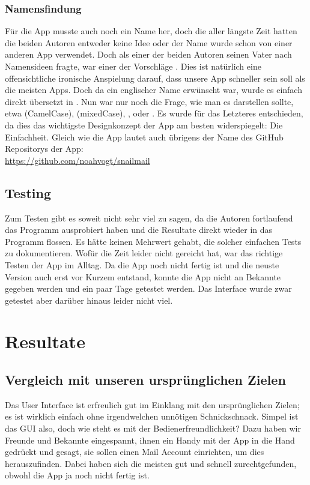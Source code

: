 \documentclass[a4paper,11pt]{article}
\begin{document}
\subsubsection{Namensfindung}
Für die App musste auch noch ein Name her, doch die aller längste Zeit hatten die beiden Autoren entweder keine Idee oder der Name wurde schon von einer anderen App verwendet. Doch als einer der beiden Autoren seinen Vater nach Namensideen fragte, war einer der Vorschläge . Dies ist natürlich eine offensichtliche ironische Anspielung darauf, dass unsere App schneller sein soll als die meisten Apps. Doch da ein englischer Name erwünscht war, wurde es einfach direkt übersetzt in . Nun war nur noch die Frage, wie man es darstellen sollte, etwa  (CamelCase),  (mixedCase), ,  oder . Es wurde für das Letzteres entschieden, da dies das wichtigste Designkonzept der App am besten widerspiegelt: Die Einfachheit. Gleich wie die App lautet auch übrigens der Name des GitHub Repositorys der App:\\

\url{https://github.com/noahvogt/snailmail}

\subsection{Testing}

Zum Testen gibt es soweit nicht sehr viel zu sagen, da die Autoren fortlaufend das Programm ausprobiert haben und die Resultate direkt wieder in das Programm flossen.
Es hätte keinen Mehrwert gehabt, die  solcher einfachen Tests zu dokumentieren. Wofür die Zeit leider nicht gereicht hat, war das 
richtige Testen der App im Alltag. Da die App noch nicht fertig ist und die neuste Version auch erst vor Kurzem entstand, konnte die App nicht an Bekannte gegeben werden
und ein paar Tage getestet werden. Das Interface wurde zwar getestet aber darüber hinaus leider nicht viel.

\section{Resultate}
\subsection{Vergleich mit unseren ursprünglichen Zielen}
Das User Interface ist erfreulich gut im Einklang mit den ursprünglichen Zielen; es ist wirklich einfach ohne irgendwelchen unnötigen Schnickschnack. Simpel ist das GUI also, doch wie steht es mit der Bedienerfreundlichkeit? Dazu haben wir Freunde und Bekannte eingespannt, ihnen ein Handy mit der App in die Hand gedrückt und gesagt, sie sollen einen Mail Account einrichten, um dies herauszufinden. Dabei haben sich die meisten gut und schnell zurechtgefunden, obwohl die App ja noch nicht fertig ist.\\
\end{document}
